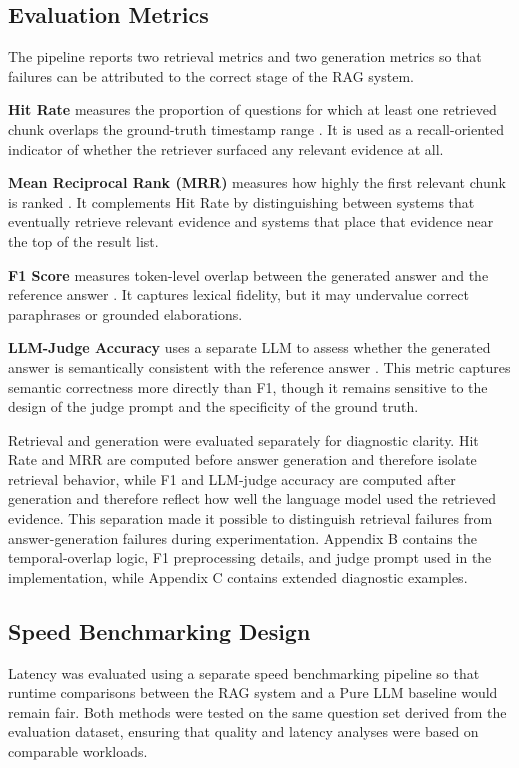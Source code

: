 \subsection{Evaluation Metrics}
The pipeline reports two retrieval metrics and two generation metrics so that failures can be attributed to the correct stage of the RAG system.

\textbf{Hit Rate} measures the proportion of questions for which at least one retrieved chunk overlaps the ground-truth timestamp range \cite{vanrijsbergen1979ir}. It is used as a recall-oriented indicator of whether the retriever surfaced any relevant evidence at all.

\textbf{Mean Reciprocal Rank (MRR)} measures how highly the first relevant chunk is ranked \cite{wikipedia2024mrr}. It complements Hit Rate by distinguishing between systems that eventually retrieve relevant evidence and systems that place that evidence near the top of the result list.

\textbf{F1 Score} measures token-level overlap between the generated answer and the reference answer \cite{vanrijsbergen1979ir}. It captures lexical fidelity, but it may undervalue correct paraphrases or grounded elaborations.

\textbf{LLM-Judge Accuracy} uses a separate LLM to assess whether the generated answer is semantically consistent with the reference answer \cite{liu2023geval}. This metric captures semantic correctness more directly than F1, though it remains sensitive to the design of the judge prompt and the specificity of the ground truth.

Retrieval and generation were evaluated separately for diagnostic clarity. Hit Rate and MRR are computed before answer generation and therefore isolate retrieval behavior, while F1 and LLM-judge accuracy are computed after generation and therefore reflect how well the language model used the retrieved evidence. This separation made it possible to distinguish retrieval failures from answer-generation failures during experimentation. Appendix B contains the temporal-overlap logic, F1 preprocessing details, and judge prompt used in the implementation, while Appendix C contains extended diagnostic examples.

\subsection{Speed Benchmarking Design}
Latency was evaluated using a separate speed benchmarking pipeline so that runtime comparisons between the RAG system and a Pure LLM baseline would remain fair. Both methods were tested on the same question set derived from the evaluation dataset, ensuring that quality and latency analyses were based on comparable workloads.

